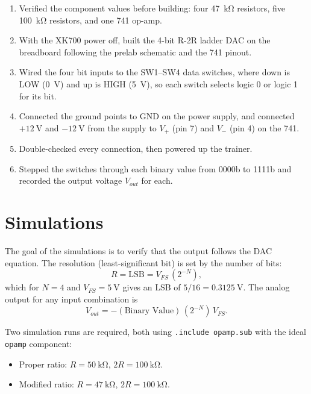 \documentclass[11pt]{article}
\begin{document}
\begin{enumerate}
    \item Verified the component values before building: four \SI{47}{\kilo\ohm} resistors, five \SI{100}{\kilo\ohm} resistors, and one 741 op-amp.
    \item With the XK700 power off, built the 4-bit R-2R ladder DAC on the breadboard following the prelab schematic and the 741 pinout.
    \item Wired the four bit inputs to the SW1--SW4 data switches, where down is LOW (\SI{0}{\volt}) and up is HIGH (\SI{5}{\volt}), so each switch selects logic 0 or logic 1 for its bit.
    \item Connected the ground points to GND on the power supply, and connected $+\SI{12}{\volt}$ and $-\SI{12}{\volt}$ from the supply to $V_+$ (pin 7) and $V_-$ (pin 4) on the 741.
    \item Double-checked every connection, then powered up the trainer.
    \item Stepped the switches through each binary value from 0000b to 1111b and recorded the output voltage $V_{out}$ for each.
\end{enumerate}

\section*{Simulations}

The goal of the simulations is to verify that the output follows the DAC equation. The resolution (least-significant bit) is set by the number of bits:
\[
    R = \text{LSB} = V_{FS}\,(2^{-N}),
\]
which for $N = 4$ and $V_{FS} = \SI{5}{\volt}$ gives an LSB of $5/16 = \SI{0.3125}{\volt}$. The analog output for any input combination is
\[
    V_{out} = -(\text{Binary Value})\,(2^{-N})\,V_{FS}.
\]

Two simulation runs are required, both using \texttt{.include opamp.sub} with the ideal \texttt{opamp} component:
\begin{itemize}
    \item Proper ratio: $R = \SI{50}{\kilo\ohm}$, $2R = \SI{100}{\kilo\ohm}$.
    \item Modified ratio: $R = \SI{47}{\kilo\ohm}$, $2R = \SI{100}{\kilo\ohm}$.
\end{itemize}
\end{document}
